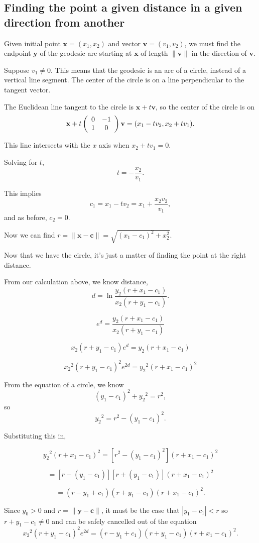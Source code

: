 \subsection{Finding the point a given distance in a given direction from another}

Given initial point $\textbf{x} = (x_1,x_2)$ and vector $\textbf{v} = (v_1,v_2)$, we must find the endpoint $\textbf{y}$ of the geodesic arc starting at $\textbf{x}$ of length $\|\textbf{v}\|$ in the direction of $\textbf{v}$.

Suppose $v_1 \neq 0$. This means that the geodesic is an arc of a circle, instead of a vertical line segment. The center of the circle is on a line perpendicular to the tangent vector.

The Euclidean line tangent to the circle is $\textbf{x}+t\textbf{v}$, so the center of the circle is on $$\textbf{x}+t\left(\begin{array}{ccc} 0 & -1 \\1 & 0 \end{array} \right)\textbf{v} = (x_1-tv_2,x_2+tv_1).$$

This line intersects with the $x$ axis when $x_2+tv_1 = 0$.

Solving for $t$, $$t = -\frac{x_2}{v_1}.$$

This implies $$c_1 = x_1-tv_2 = x_1+\frac{x_2v_2}{v_1},$$ and as before, $c_2 = 0$.

Now we can find $r = \|\textbf{x}-\textbf{c}\| = \sqrt{(x_1 - c_1)^2 + x_2^2}$.


Now that we have the circle, it's just a matter of finding the point at the right distance.

From our calculation above, we know distance, $$d = \ln\frac{y_2(r+x_1-c_1)}{x_2(r+y_1-c_1)}.$$

$$e^d = \frac{y_2(r+x_1-c_1)}{x_2(r+y_1-c_1)}$$

$$x_2(r+y_1-c_1)e^d = y_2(r+x_1-c_1)$$

$${x_2}^2(r+y_1-c_1)^2e^{2d} = {y_2}^2(r+x_1-c_1)^2$$

From the equation of a circle, we know $$(y_1-c_1)^2 + {y_2}^2 = r^2,$$ so $${y_2}^2 = r^2 - (y_1-c_1)^2.$$

Substituting this in,

$${y_2}^2(r+x_1-c_1)^2 = [r^2-(y_1-c_1)^2](r+x_1-c_1)^2$$

$$= [r-(y_1-c_1)][r+(y_1-c_1)](r+x_1-c_1)^2$$

$$= (r-y_1+c_1)(r+y_1-c_1)(r+x_1-c_1)^2.$$

Since $y_0 > 0$ and $r = \|\textbf{y}-\textbf{c}\|$, it must be the case that $|y_1-c_1| < r$ so $r+y_1-c_1 \neq 0$ and can be safely cancelled out of the equation $${x_2}^2(r+y_1-c_1)^2e^{2d} = (r-y_1+c_1)(r+y_1-c_1)(r+x_1-c_1)^2.$$

